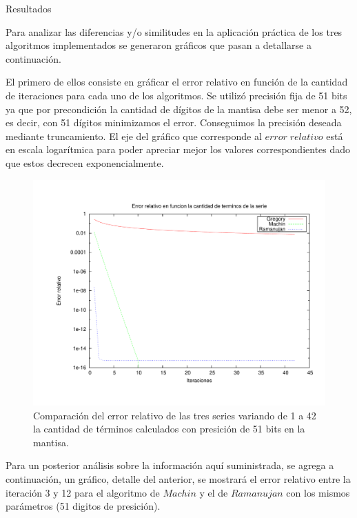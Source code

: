 \begin{section}{Resultados}

	Para analizar las diferencias y/o similitudes en la aplicación práctica de los tres algoritmos implementados se generaron gráficos que pasan a detallarse a continuación. 
		
	El primero de ellos consiste en gráficar el error relativo en función de la cantidad de iteraciones para cada uno de los algoritmos. Se utilizó precisión fija de 51 bits ya que por precondición la cantidad de dígitos de la mantisa debe ser menor a 52, es decir, con 51 dígitos minimizamos el error. Conseguimos la precisión deseada mediante truncamiento.
	El eje del gráfico que corresponde al $error\;relativo$ está en escala logarítmica para poder apreciar mejor los valores correspondientes dado que estos decrecen exponencialmente.

	\begin{figure}[H]
	  \centering
		\includegraphics[width=14cm]{graficos/comparacion_1a42it_51p.pdf}
	  \caption{Comparación del error relativo de las tres series variando de 1 a 42 la cantidad de términos calculados con presición de 51 bits en la mantisa.}
	  \label{fig:51p}
	\end{figure}

	Para un posterior análisis sobre la información aquí suministrada, se agrega a continuación, un gráfico, detalle del anterior, se mostrará el error relativo entre la iteración 3 y 12 para el algoritmo de $Machin$ y el de $Ramanujan$ con los mismos parámetros (51 digitos de presición).
	

\end{section}
